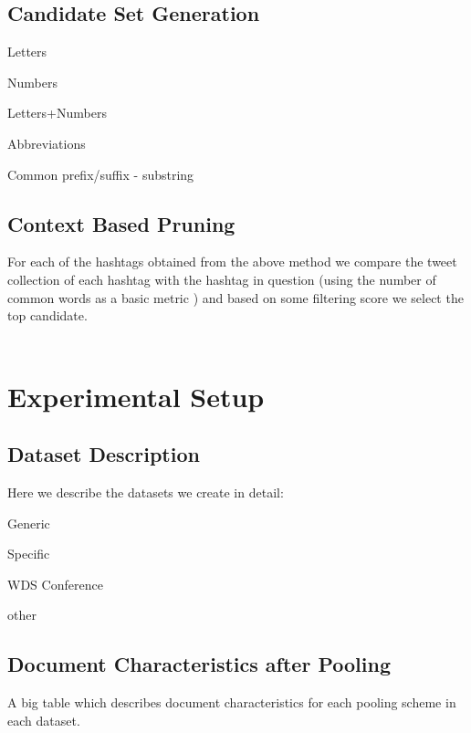 \documentclass[10pt,a5paper,twoside]{article}
\begin{document}
\subsection{Candidate Set Generation}
\begin{compactitem}
\item Letters
\item Numbers
\item Letters+Numbers
\item Abbreviations
\item Common prefix/suffix - substring
\end{compactitem}

\subsection{Context Based Pruning}
For each of the hashtags obtained from the above method we compare the tweet collection of each hashtag with the hashtag in question (using the number of common words as a basic metric ) and based on some filtering score we select the top candidate.\\\\



\section{Experimental Setup}
\subsection{Dataset Description}
Here we describe the datasets we create in detail:
\begin{compactitem}
\item Generic
\item Specific
\item WDS Conference
\item other\\
\end{compactitem}

\subsection{Document Characteristics after Pooling}
A big table which describes document characteristics for each pooling scheme in each dataset.\\
\end{document}
